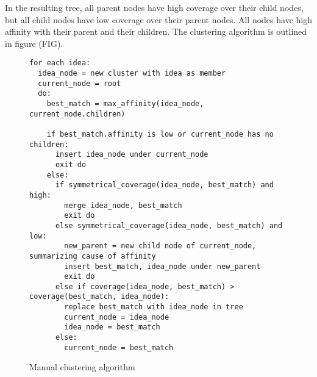 In the resulting tree, all parent nodes have high coverage over their child nodes, but all child nodes have low coverage over their parent nodes. All nodes have high affinity with their parent and their children. The clustering algorithm is outlined in figure (FIG).

\begin{figure*}[h]
\begin{verbatim}
for each idea:
  idea_node = new cluster with idea as member
  current_node = root
  do:
    best_match = max_affinity(idea_node, current_node.children)

    if best_match.affinity is low or current_node has no children:
      insert idea_node under current_node
      exit do
    else:
      if symmetrical_coverage(idea_node, best_match) and high:
        merge idea_node, best_match
        exit do
      else symmetrical_coverage(idea_node, best_match) and low:
        new_parent = new child node of current_node, summarizing cause of affinity
        insert best_match, idea_node under new_parent
        exit do
      else if coverage(idea_node, best_match) > coverage(best_match, idea_node):
        replace best_match with idea_node in tree
        current_node = idea_node
        idea_node = best_match
      else:
        current_node = best_match
\end{verbatim}
\caption{Manual clustering algorithm}
\label{fig:cluseringalg}
\end{figure*}
